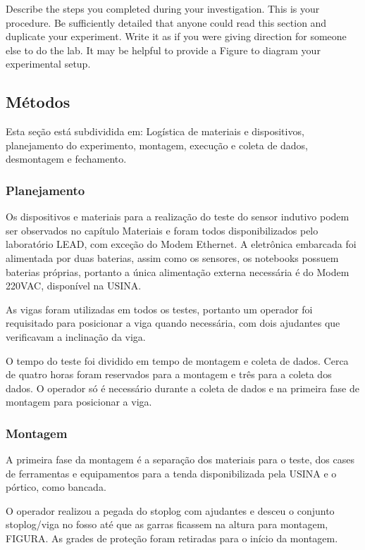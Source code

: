 
Describe the steps you completed during your investigation. This is your procedure. Be sufficiently detailed that anyone could read this section and duplicate your experiment. Write it as if you were giving direction for someone else to do the lab. It may be helpful to provide a Figure to diagram your experimental setup.


\subsection{Métodos}
Esta seção está subdividida em: Logística de materiais e dispositivos,
planejamento do experimento, montagem, execução e coleta de dados,
desmontagem e fechamento.
 
\subsubsection{Planejamento}

Os dispositivos e materiais para a realização do teste do sensor indutivo podem
ser observados no capítulo Materiais e foram todos disponibilizados pelo
laboratório LEAD, com exceção do Modem Ethernet. A eletrônica embarcada foi
alimentada por duas baterias, assim como os sensores, os notebooks possuem
baterias próprias, portanto a única alimentação externa necessária é do Modem
220VAC, disponível na USINA.

As vigas foram utilizadas em todos os testes, portanto um operador foi
requisitado para posicionar a viga quando necessária, com dois ajudantes que
verificavam a inclinação da viga.

O tempo do teste foi dividido em tempo de montagem e coleta de dados. Cerca de
quatro horas foram reservados para a montagem e três para a coleta dos dados.
O operador só é necessário durante a coleta de dados e na primeira fase de
montagem para posicionar a viga.

\subsubsection{Montagem}
A primeira fase da montagem é a separação dos materiais para o teste, dos cases
de ferramentas e equipamentos para a tenda disponibilizada pela USINA e o
pórtico, como bancada.

O operador realizou a pegada do stoplog com ajudantes e desceu o conjunto
stoplog/viga no fosso até que as garras ficassem na altura para montagem,
FIGURA.
As grades de proteção foram retiradas para o início da montagem.

